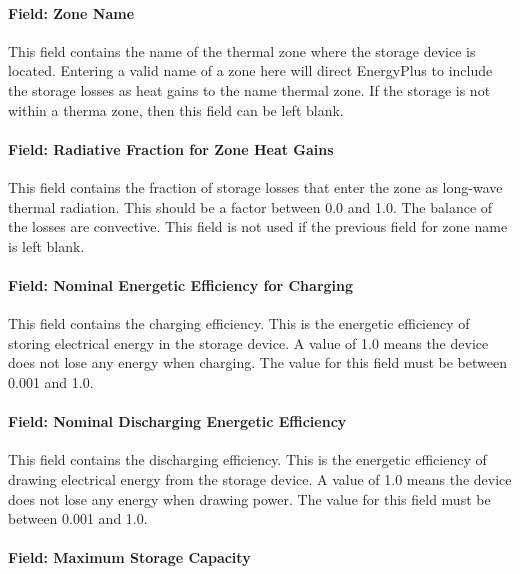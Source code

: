 \paragraph{Field: Zone Name}\label{field-zone-name-5-000}

This field contains the name of the thermal zone where the storage device is located. Entering a valid name of a zone here will direct EnergyPlus to include the storage losses as heat gains to the name thermal zone. If the storage is not within a therma zone, then this field can be left blank.

\paragraph{Field: Radiative Fraction for Zone Heat Gains}\label{field-radiative-fraction-for-zone-heat-gains}

This field contains the fraction of storage losses that enter the zone as long-wave thermal radiation. This should be a factor between 0.0 and 1.0. The balance of the losses are convective. This field is not used if the previous field for zone name is left blank.

\paragraph{Field: Nominal Energetic Efficiency for Charging}\label{field-nominal-energetic-efficiency-for-charging}

This field contains the charging efficiency. This is the energetic efficiency of storing electrical energy in the storage device. A value of 1.0 means the device does not lose any energy when charging. The value for this field must be between 0.001 and 1.0.

\paragraph{Field: Nominal Discharging Energetic Efficiency}\label{field-nominal-discharging-energetic-efficiency}

This field contains the discharging efficiency. This is the energetic efficiency of drawing electrical energy from the storage device. A value of 1.0 means the device does not lose any energy when drawing power. The value for this field must be between 0.001 and 1.0.

\paragraph{Field: Maximum Storage Capacity}\label{field-maximum-storage-capacity}


